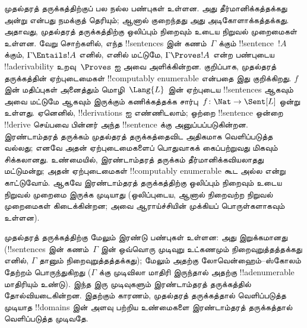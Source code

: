 \documentclass[../../../include/open-logic-section]{subfiles}
\begin{document}



முதல்தரத் தருக்கத்திற்குப் பல நல்ல பண்புகள் உள்ளன. அது
தீர்மானிக்கத்தக்கது அன்று என்பது நமக்குத் தெரியும்; ஆனால் குறைந்தது அது
அடிகோளாக்கத்தக்கது. அதாவது, முதல்தரத் தருக்கத்திற்கு ஒலிப்பும்
நிறைவும் உடைய நிறுவல் முறைமைகள் உள்ளன. வேறு சொற்களில், எந்த
!!{sentence}s இன் கணம்~$\Gamma$ க்கும் !!{sentence}~$!A$ க்கும்,
$\Gamma \Entails !A$ எனில், எனில் மட்டுமே, $\Gamma \Proves !A$
என்ற பண்புடைய !!a{derivability} உறவு~$\Proves$ ஐ அவை அளிக்கின்றன.
குறிப்பாக, முதல்தரத் தருக்கத்தின் ஏற்புடைமைகள் !!{computably
  enumerable} என்பதை இது குறிக்கிறது. $f$ இன் மதிப்புகள் அனைத்தும்
மொழி~$\Lang{L}$ இன் ஏற்புடைய !!{sentence}s ஆகவும் அவை மட்டுமே
ஆகவும் இருக்கும் கணிக்கத்தக்க சார்பு~$f\colon \Nat \to \Sent[L]$
ஒன்று உள்ளது. ஏனெனில், !!{derivation}s ஐ எண்ணிடலாம்; ஒற்றை
!!{sentence} ஒன்றை !!{derive} செய்பவை பின்னர் அந்த !!{sentence} க்கு
அனுப்பப்படுகின்றன. இரண்டாம்தரத் தருக்கம் முதல்தரத் தருக்கத்தைவிட
அதிகமாக வெளிப்படுத்த வல்லது; எனவே அதன் ஏற்புடைமைகளைப் பொதுவாகக்
கைப்பற்றுவது மிகவும் சிக்கலானது. உண்மையில், இரண்டாம்தரத் தருக்கம்
தீர்மானிக்கவியலாதது மட்டுமன்று; அதன் ஏற்புடைமைகள் !!{computably
  enumerable} கூட அல்ல என்று காட்டுவோம். ஆகவே இரண்டாம்தரத்
தருக்கத்திற்கு ஒலிப்பும் நிறைவும் உடைய நிறுவல் முறைமை இருக்க முடியாது
(ஒலிப்புடைய, ஆனால் நிறைவற்ற நிறுவல் முறைமைகள் கிடைக்கின்றன; அவை
ஆராய்ச்சியின் முக்கியப் பொருள்களாகவும் உள்ளன).

முதல்தரத் தருக்கத்திற்கு மேலும் இரண்டு பண்புகள் உள்ளன: அது
இறுக்கமானது (!!{sentence}s இன் கணம்~$\Gamma$ இன் ஒவ்வொரு
முடிவுறு உட்கணமும் நிறைவுறுத்தத்தக்கது எனில், $\Gamma$ தானும்
நிறைவுறுத்தத்தக்கது); மேலும் அதற்கு லோவென்ஹைம்--ஸ்கோலம் தேற்றம்
பொருந்துகிறது ($\Gamma$ க்கு முடிவிலா மாதிரி இருந்தால் அதற்கு
!!a{denumerable} மாதிரியும் உண்டு). இந்த இரு முடிவுகளும் இரண்டாம்தரத்
தருக்கத்தில் தோல்வியடைகின்றன. இதற்கும் காரணம், முதல்தரத் தருக்கத்தால்
வெளிப்படுத்த முடியாத !!{domain}s இன் அளவு பற்றிய உண்மைகளை
இரண்டாம்தரத் தருக்கத்தால் வெளிப்படுத்த முடிவதே.
\end{document}
